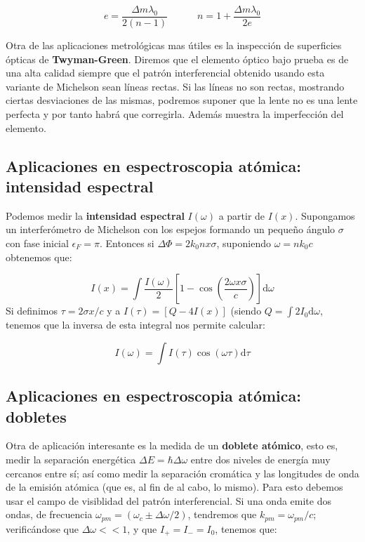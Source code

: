 \documentclass[12pt,a4paper]{book}
\numberwithin{equation}{section}
\numberwithin{figure}{section}
\newcommand{\tquad}{\quad \quad \quad}
\newcommand{\parentesis}[1]{\left( #1  \right)}
\newcommand{\ccorchetes}[1]{\left[ #1  \right]}
\newcommand{\D}{\mathrm{d}}
\newcommand{\1}{_{(1)}}
\newcommand{\2}{_{(2)}}
\theoremstyle{definition}
\begin{document}
\begin{equation}
e = \frac{\Delta m \lambda_0}{2(n-1)} \tquad n=1+\dfrac{\Delta m \lambda_0}{2e}
\end{equation}

Otra de las aplicaciones metrológicas mas útiles es la inspección de superficies ópticas de \textbf{Twyman-Green}. Diremos que el elemento óptico bajo prueba es de una alta calidad siempre que el patrón interferencial obtenido usando esta variante de Michelson sean líneas rectas. Si las líneas no son rectas, mostrando ciertas desviaciones de las mismas, podremos suponer que la lente no es una lente perfecta y por tanto habrá que corregirla. Además muestra la imperfección del elemento. 


\subsection{Aplicaciones en espectroscopia atómica: intensidad espectral}

Podemos medir la \textbf{intensidad espectral} $I(\omega)$ a partir de $I(x)$. Supongamos un interferómetro de Michelson con los espejos formando un pequeño ángulo $\sigma$ con fase inicial $\epsilon_F=\pi$. Entonces si $\Delta \Phi = 2k_0nx\sigma$, suponiendo $\omega = nk_0c$ obtenemos que:

\begin{equation}
I(x) = \int  \frac{I(\omega)}{2} \ccorchetes{1 - \cos \parentesis{\frac{2\omega x \sigma}{c}}} \D \omega
\end{equation}
Si definimos $\tau=2\sigma x/c$ y a $I(\tau) = [Q-4I(x) ]$ (siendo $Q=\int 2 I_0 \D \omega$, tenemos que la inversa de esta integral nos permite calcular:

\begin{equation}
I(\omega) = \int I(\tau) \cos (\omega \tau) \D  \tau
\end{equation}

\subsection{Aplicaciones en espectroscopia atómica: dobletes}

Otra de aplicación interesante es la medida de un \textbf{doblete atómico}, esto es, medir la separación energética $\Delta E = \hbar \Delta \omega$ entre dos niveles de energía muy cercanos entre sí; así como medir la separación cromática y las longitudes de onda de la emisión atómica (que es, al fin de al cabo, lo mismo). Para esto debemos usar el campo de visiblidad del patrón interferencial. Si una onda emite dos ondas, de frecuencia $\omega_{pm} = (\omega_c \pm \Delta \omega/2)$, tendremos que $k_{pm}=\omega_{pm}/c$; verificándose que $\Delta \omega << 1$, y que $I_+=I_-=I_0$, tenemos que:
\end{document}
